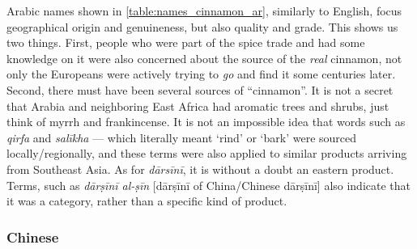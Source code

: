 Arabic names shown in \cref{table:names_cinnamon_ar}, similarly to English, focus geographical origin and genuineness, but also quality and grade. This shows us two things. First, people who were part of the spice trade and had some knowledge  on it were also concerned about the source of the \emph{real} cinnamon, not only the Europeans were actively trying to \emph{go} and find it some centuries later. Second, there must have been several sources of ``cinnamon''. It is not a secret that Arabia and neighboring East Africa had aromatic trees and shrubs, just think of myrrh and frankincense. It is not an impossible idea that words such as \textit{qirfa} and \textit{salīkha} --- which literally meant `rind' or `bark' were sourced locally/regionally, and these terms were also applied to similar products arriving from Southeast Asia. As for \textit{dārsīnī}, it is without a doubt an eastern product. Terms, such as \textit{dārṣīnī al-ṣīn} [dārṣīnī of China/Chinese dārṣīnī] also indicate that it was a category, rather than a specific kind of product. 



\subsubsection{Chinese}
\label{sec:cinnamon_names_zh}

